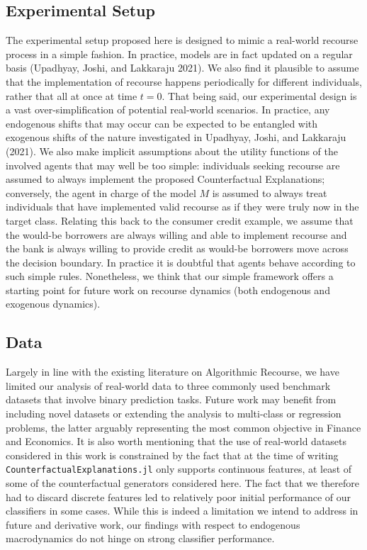 \documentclass[conference,final,]{IEEEtran}
\begin{document}
\hypertarget{experimental-setup}{%
\subsection{Experimental Setup}\label{experimental-setup}}

The experimental setup proposed here is designed to mimic a real-world recourse process in a simple fashion. In practice, models are in fact updated on a regular basis (Upadhyay, Joshi, and Lakkaraju 2021). We also find it plausible to assume that the implementation of recourse happens periodically for different individuals, rather that all at once at time \(t=0\). That being said, our experimental design is a vast over-simplification of potential real-world scenarios. In practice, any endogenous shifts that may occur can be expected to be entangled with exogenous shifts of the nature investigated in Upadhyay, Joshi, and Lakkaraju (2021). We also make implicit assumptions about the utility functions of the involved agents that may well be too simple: individuals seeking recourse are assumed to always implement the proposed Counterfactual Explanations; conversely, the agent in charge of the model \(M\) is assumed to always treat individuals that have implemented valid recourse as if they were truly now in the target class. Relating this back to the consumer credit example, we assume that the would-be borrowers are always willing and able to implement recourse and the bank is always willing to provide credit as would-be borrowers move across the decision boundary. In practice it is doubtful that agents behave according to such simple rules. Nonetheless, we think that our simple framework offers a starting point for future work on recourse dynamics (both endogenous and exogenous dynamics).

\hypertarget{limit-data}{%
\subsection{Data}\label{limit-data}}

Largely in line with the existing literature on Algorithmic Recourse, we have limited our analysis of real-world data to three commonly used benchmark datasets that involve binary prediction tasks. Future work may benefit from including novel datasets or extending the analysis to multi-class or regression problems, the latter arguably representing the most common objective in Finance and Economics. It is also worth mentioning that the use of real-world datasets considered in this work is constrained by the fact that at the time of writing \texttt{CounterfactualExplanations.jl} only supports continuous features, at least of some of the counterfactual generators considered here. The fact that we therefore had to discard discrete features led to relatively poor initial performance of our classifiers in some cases. While this is indeed a limitation we intend to address in future and derivative work, our findings with respect to endogenous macrodynamics do not hinge on strong classifier performance.
\end{document}
